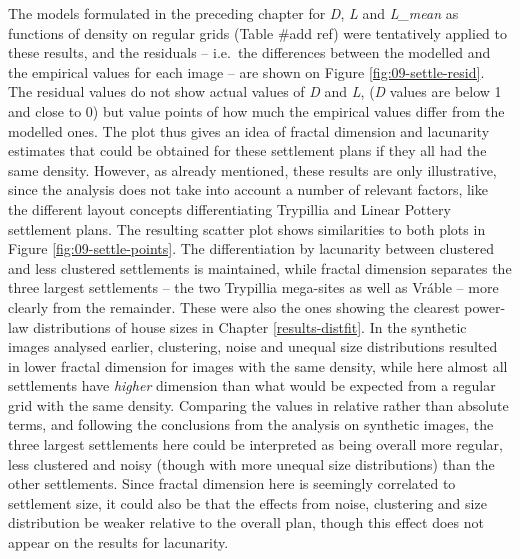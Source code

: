 \documentclass[
  12pt,
]{book}
\begin{document}
The models formulated in the preceding chapter for \emph{D}, \emph{L} and \emph{L\_mean} as functions of density on regular grids (Table \#add ref) were tentatively applied to these results, and the residuals -- i.e.~the differences between the modelled and the empirical values for each image -- are shown on Figure \ref{fig:09-settle-resid}. The residual values do not show actual values of \emph{D} and \emph{L}, (\emph{D} values are below 1 and close to 0) but value points of how much the empirical values differ from the modelled ones. The plot thus gives an idea of fractal dimension and lacunarity estimates that could be obtained for these settlement plans if they all had the same density. However, as already mentioned, these results are only illustrative, since the analysis does not take into account a number of relevant factors, like the different layout concepts differentiating Trypillia and Linear Pottery settlement plans. The resulting scatter plot shows similarities to both plots in Figure \ref{fig:09-settle-points}. The differentiation by lacunarity between clustered and less clustered settlements is maintained, while fractal dimension separates the three largest settlements -- the two Trypillia mega-sites as well as Vráble -- more clearly from the remainder. These were also the ones showing the clearest power-law distributions of house sizes in Chapter \ref{results-distfit}. In the synthetic images analysed earlier, clustering, noise and unequal size distributions resulted in lower fractal dimension for images with the same density, while here almost all settlements have \emph{higher} dimension than what would be expected from a regular grid with the same density. Comparing the values in relative rather than absolute terms, and following the conclusions from the analysis on synthetic images, the three largest settlements here could be interpreted as being overall more regular, less clustered and noisy (though with more unequal size distributions) than the other settlements. Since fractal dimension here is seemingly correlated to settlement size, it could also be that the effects from noise, clustering and size distribution be weaker relative to the overall plan, though this effect does not appear on the results for lacunarity.
\end{document}

